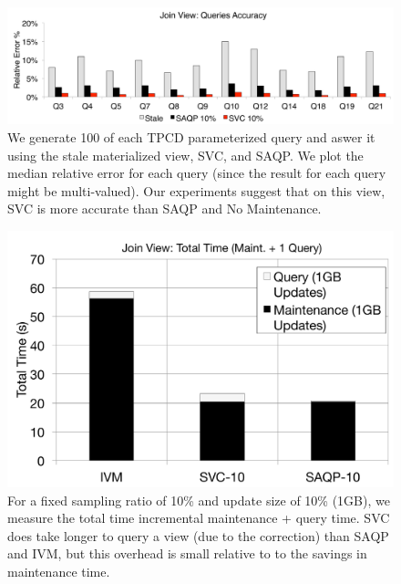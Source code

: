 \begin{figure}[t]
\centering
\includegraphics[scale=0.16]{exp/msj_3.pdf}
 \caption{We generate 100 of each TPCD parameterized query and aswer it using the stale materialized view, SVC, and SAQP. We plot the median relative error for each query (since the result for each query might be multi-valued). Our experiments suggest that on this view, SVC is more accurate than SAQP and No Maintenance.\label{exp-1-acc}}
\end{figure}

\begin{figure}[t]
\centering
 \includegraphics[scale=0.20]{exp/msj_4.pdf}
  \caption{For a fixed sampling ratio of 10\% and update size of 10\% (1GB), we measure the total time incremental maintenance + query time. SVC does take longer to query a view (due to the correction) than SAQP and IVM, but this overhead is small relative to to the savings in maintenance time. }
\end{figure}

